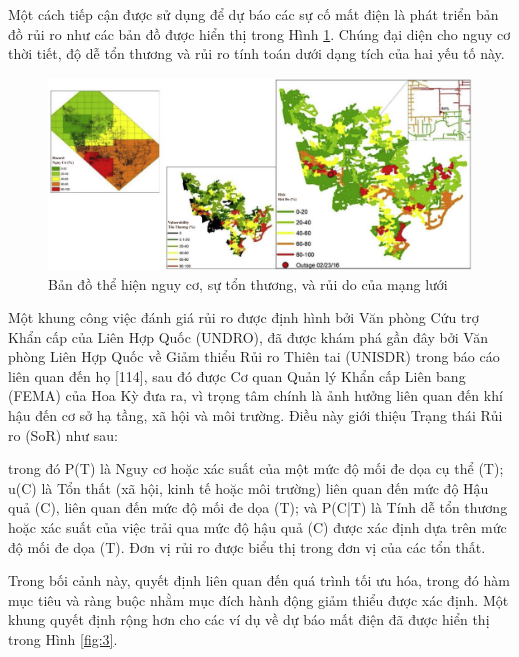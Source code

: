 \documentclass[utf8]{frontiersSCNS} %
\begin{document}
Một cách tiếp cận được sử dụng để dự báo các sự cố mất điện là phát triển bản đồ rủi ro như các bản đồ được hiển thị trong Hình \ref{fig:2}. Chúng đại diện cho nguy cơ thời tiết, độ dễ tổn thương và rủi ro tính toán dưới dạng tích của hai yếu tố này.


\begin{figure}[h!]
	\centering
	\begin{center}
		\includegraphics[width=\textwidth]{ruido}%
	\end{center}
	\caption{Bản đồ thể hiện nguy cơ, sự tổn thương, và rủi do của mạng lưới}\label{fig:2}
\end{figure}



Một khung công việc đánh giá rủi ro được định hình bởi Văn phòng Cứu trợ Khẩn cấp của Liên Hợp Quốc (UNDRO), đã được khám phá gần đây bởi Văn phòng Liên Hợp Quốc về Giảm thiểu Rủi ro Thiên tai (UNISDR) trong báo cáo liên quan đến họ [114], sau đó được Cơ quan Quản lý Khẩn cấp Liên bang (FEMA) của Hoa Kỳ đưa ra, vì trọng tâm chính là ảnh hưởng liên quan đến khí hậu đến cơ sở hạ tầng, xã hội và môi trường. Điều này giới thiệu Trạng thái Rủi ro (SoR) như sau:

trong đó P(T) là Nguy cơ hoặc xác suất của một mức độ mối đe dọa cụ thể (T); u(C) là Tổn thất (xã hội, kinh tế hoặc môi trường) liên quan đến mức độ Hậu quả (C), liên quan đến mức độ mối đe dọa (T); và P(C|T) là Tính dễ tổn thương hoặc xác suất của việc trải qua mức độ hậu quả (C) được xác định dựa trên mức độ mối đe dọa (T). Đơn vị rủi ro được biểu thị trong đơn vị của các tổn thất.

Trong bối cảnh này, quyết định liên quan đến quá trình tối ưu hóa, trong đó hàm mục tiêu và ràng buộc nhằm mục đích hành động giảm thiểu được xác định. Một khung quyết định rộng hơn cho các ví dụ về dự báo mất điện đã được hiển thị trong Hình \ref{fig:3}.
\end{document}
